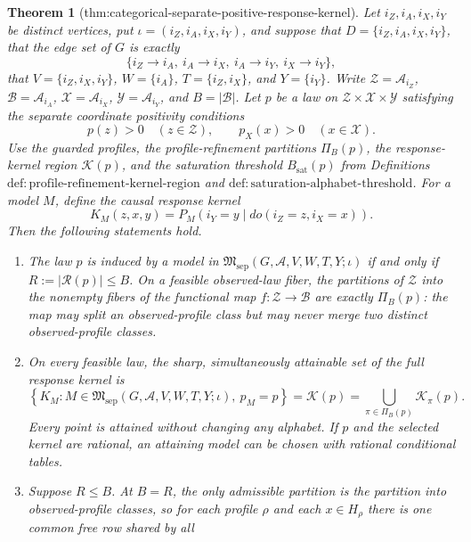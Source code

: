 \documentclass{article}
\newtheorem{theorem}{Theorem}
\begin{document}
\begin{theorem}[thm:categorical-separate-positive-response-kernel]\label{thm:categorical-separate-positive-response-kernel}
Let \(i_Z,i_A,i_X,i_Y\) be distinct vertices, put
\(\iota=(i_Z,i_A,i_X,i_Y)\), and suppose that
\(D=\{i_Z,i_A,i_X,i_Y\}\), that the edge set of \(G\) is exactly
\[
 \{i_Z\mathbin{\to}i_A,\ i_A\mathbin{\to}i_X,
   \ i_A\mathbin{\to}i_Y,\ i_X\mathbin{\to}i_Y\},
\]
that \(V=\{i_Z,i_X,i_Y\}\), \(W=\{i_A\}\),
\(T=\{i_Z,i_X\}\), and \(Y=\{i_Y\}\).  Write
\(\mathcal Z=\mathcal A_{i_Z}\), \(\mathcal B=\mathcal A_{i_A}\),
\(\mathcal X=\mathcal A_{i_X}\), \(\mathcal Y=\mathcal A_{i_Y}\),
and \(B=\lvert\mathcal B\rvert\).  Let \(p\) be a law on
\(\mathcal Z\times\mathcal X\times\mathcal Y\) satisfying the separate
coordinate positivity conditions
\[
 p(z)>0\quad(z\in\mathcal Z),
 \qquad p_X(x)>0\quad(x\in\mathcal X).
\]
Use the guarded profiles, the profile-refinement partitions
\(\Pi_B(p)\), the response-kernel region \(\mathcal K(p)\), and the
saturation threshold \(B_{\mathrm{sat}}(p)\) from Definitions
\(\mathrm{def:profile\text{-}refinement\text{-}kernel\text{-}region}\)
and \(\mathrm{def:saturation\text{-}alphabet\text{-}threshold}\).  For a
model \(M\), define the causal response kernel
\[
 K_M(z,x,y)=P_M(i_Y=y\mid do(i_Z=z,i_X=x)).
\]
Then the following statements hold.
\begin{enumerate}
\item The law \(p\) is induced by a model in
\(\mathfrak M_{\mathrm{sep}}(G,\mathcal A,V,W,T,Y;\iota)\) if and only if
\(R:=\lvert\mathcal R(p)\rvert\leq B\).  On a feasible observed-law
fiber, the partitions of \(\mathcal Z\) into the nonempty fibers of the
functional map \(f:\mathcal Z\to\mathcal B\) are exactly
\(\Pi_B(p)\): the map may split an observed-profile class but may never
merge two distinct observed-profile classes.
\item On every feasible law, the sharp, simultaneously attainable set of
the full response kernel is
\[
 \left\{K_M:M\in
 \mathfrak M_{\mathrm{sep}}(G,\mathcal A,V,W,T,Y;\iota),\ p_M=p\right\}
 =\mathcal K(p)
 =\bigcup_{\pi\in\Pi_B(p)}\mathcal K_\pi(p).
\]
Every point is attained without changing any alphabet.  If \(p\) and the
selected kernel are rational, an attaining model can be chosen with
rational conditional tables.
\item Suppose \(R\leq B\).  At \(B=R\), the only admissible partition is
the partition into observed-profile classes, so for each profile \(\rho\)
and each \(x\in H_\rho\) there is one common free row shared by all

\end{enumerate}
\end{theorem}
\end{document}
